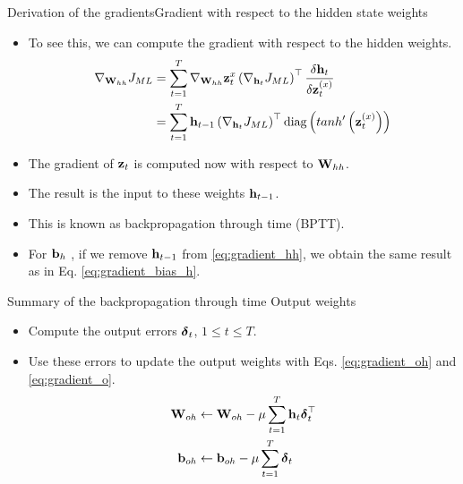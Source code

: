 \documentclass{beamer}
\begin{document}
\begin{frame}{Derivation of the gradients}{Gradient with respect to the hidden state weights}
    \begin{itemize}
        \item 
To see this, we can compute the gradient  with respect to the hidden weights.
\begin{equation}\label{eq:gradient_hh}
\begin{split}
    \nabla_{{\bf W}_{hh}} J_{ML} &=\sum_{t=1}^T \nabla_{{\bf W}_{hh}}{\bf z}^{x}_t  \left(\nabla_{{\bf h}_t} J_{ML}\right)^\top \frac{\delta {\bf h}_t}{\delta {\bf z}^{(x)}_t}\\
    &=\sum_{t=1}^T {\bf h}_{t-1}   \left(\nabla_{{\bf h}_t} J_{ML}\right)^\top\text{diag}\left( tanh'\left({\bf z}^{(x)}_t\right) \right)
\end{split}
\end{equation}
\item The gradient of ${\bf z}_t$ is computed now with respect to ${\bf W}_{hh}$.
\item The result is the input to these weights ${\bf h}_{t-1}$.
\item This is known as backpropagation through time (BPTT). 
\item For ${\bf b}_h$ , if we remove ${\bf h}_{t-1}$ from \eqref{eq:gradient_hh}, we obtain the same result as in Eq. \eqref{eq:gradient_bias_h}. 
    \end{itemize}
\end{frame}

\begin{frame}{Summary of the backpropagation through time}
{Output weights}
    \begin{itemize}
        \item Compute the output errors ${\boldsymbol \delta}_t$, $1 \leq t \leq T$.
        \item Use these errors to update the output weights with Eqs. \eqref{eq:gradient_oh} and \eqref{eq:gradient_o}.
\begin{equation}
\begin{split}
 {\bf W}_{oh} &\leftarrow {\bf W}_{oh} -\mu   \sum_{t=1}^T   {\bf h}_{t}{\boldsymbol \delta}_{t}^\top \\
 {\bf b}_{oh} &\leftarrow {\bf b}_{oh} -\mu   \sum_{t=1}^T   {\boldsymbol \delta}_{t} \\
 \end{split}
\end{equation}
    \end{itemize}
\end{frame}
\end{document}
